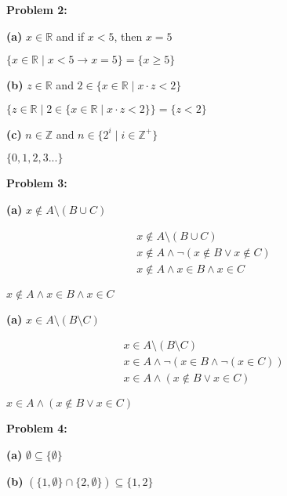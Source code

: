 \documentclass{article}
\begin{document}
    \textbf{Problem 2:}

    \quad \textbf{(a)} $x \in \mathbb{R}$ and if $x<5$, then $x=5$

    \quad\quad$\boxed{\{x \in \mathbb{R}\;|\; x<5 \rightarrow x=5\} = \{x \geq 5\}}$

    \quad \textbf{(b)} $z \in \mathbb{R}$ and $2 \in \{x \in \mathbb{R} \; | \; x \cdot z < 2\}$

    \quad\quad$\boxed{\{ z \in \mathbb{R} \; | \; 2 \in \{x \in \mathbb{R} \; | \; x \cdot z < 2\}\} =\{z < 2 \}}$

    \quad \textbf{(c)} $n \in \mathbb{Z}$ and $n \in \{2^i \; | \; i \in \mathbb{Z}^+\}$

    \quad\quad$\boxed{\{0,1,2,3...\}}$

    \textbf{Problem 3:}

    \quad \textbf{(a)} $x \notin A \setminus (B\cup C)$

    \begin{gather*}
        x \notin A \setminus (B\cup C) \\
        x \notin A \land \neg(x \notin B \lor x\notin C) \\
        x \notin A \land x \in B \land x \in C
    \end{gather*}

    \quad\quad $\boxed{x \notin A \land x \in B \land x \in C}$

    \quad \textbf{(a)} $x \in A \setminus (B\setminus C)$

    \begin{gather*}
        x \in A \setminus (B\setminus C) \\
        x \in A \land \neg(x \in B \land \neg(x\in C)) \\
        x \in A \land (x \notin B \lor x \in C)
    \end{gather*}

    \quad\quad $\boxed{x \in A \land (x \notin B \lor x \in C)}$

    \textbf{Problem 4:}

    \quad \textbf{(a)} $\emptyset \subseteq \{\emptyset\}$


    \quad \textbf{(b)} $(\{1,\emptyset\}\cap\{2,\emptyset\}) \subseteq \{1,2\}$

\end{document}

